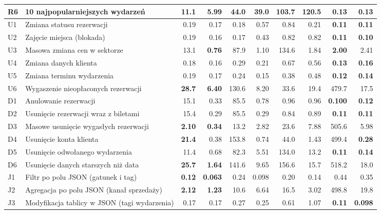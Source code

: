 \begin{tabular}{llrrrrrrrr}
R6 & 10 najpopularniejszych wydarzeń & \num{11.1} & \num{5.99} & \num{44.0} & \num{39.0} & \num{103.7} & \num{120.5} & \textbf{\num{0.13}} & \textbf{\num{0.13}} \\
\midrule
U1 & Zmiana statusu rezerwacji & \num{0.19} & \num{0.17} & \num{0.18} & \num{0.57} & \num{0.84} & \num{0.21} & \textbf{\num{0.11}} & \textbf{\num{0.11}} \\
U2 & Zajęcie miejsca (blokada) & \num{0.19} & \num{0.16} & \num{0.17} & \num{0.43} & \num{0.82} & \num{0.82} & \textbf{\num{0.11}} & \textbf{\num{0.10}} \\
U3 & Masowa zmiana cen w sektorze & \num{13.1} & \textbf{\num{0.76}} & \num{87.9} & \num{1.10} & \num{134.6} & \num{1.84} & \textbf{\num{2.00}} & \num{2.41} \\
U4 & Zmiana danych klienta & \num{0.18} & \num{0.16} & \num{0.29} & \num{0.21} & \num{0.67} & \num{0.56} & \textbf{\num{0.13}} & \textbf{\num{0.16}} \\
U5 & Zmiana terminu wydarzenia & \num{0.19} & \num{0.17} & \num{0.24} & \num{0.15} & \num{0.38} & \num{0.48} & \textbf{\num{0.12}} & \textbf{\num{0.14}} \\
U6 & Wygaszenie nieopłaconych rezerwacji & \textbf{\num{28.7}} & \textbf{\num{6.40}} & \num{130.6} & \num{8.20} & \num{33.6} & \num{19.4} & \num{479.7} & \num{17.5} \\
\midrule
D1 & Anulowanie rezerwacji & \num{15.1} & \num{0.33} & \num{85.5} & \num{0.78} & \num{0.96} & \num{0.96} & \textbf{\num{0.100}} & \textbf{\num{0.12}} \\
D2 & Usunięcie rezerwacji wraz z biletami & \num{15.4} & \num{0.29} & \num{85.5} & \num{0.29} & \num{0.84} & \num{0.89} & \textbf{\num{0.11}} & \textbf{\num{0.11}} \\
D3 & Masowe usunięcie wygasłych rezerwacji & \textbf{\num{2.10}} & \textbf{\num{0.34}} & \num{13.2} & \num{2.82} & \num{23.6} & \num{7.88} & \num{505.6} & \num{5.98} \\
D4 & Usunięcie konta klienta & \textbf{\num{21.4}} & \num{0.38} & \num{153.8} & \num{0.74} & \num{44.0} & \num{1.43} & \num{499.4} & \textbf{\num{0.28}} \\
D5 & Usunięcie odwołanego wydarzenia & \num{11.4} & \num{0.68} & \num{82.3} & \num{5.51} & \num{134.0} & \num{13.2} & \textbf{\num{0.11}} & \textbf{\num{0.14}} \\
D6 & Usunięcie danych starszych niż data & \textbf{\num{25.7}} & \textbf{\num{1.64}} & \num{141.6} & \num{9.65} & \num{156.6} & \num{15.7} & \num{518.2} & \num{18.0} \\
\midrule
J1 & Filtr po polu JSON (gatunek i tag) & \textbf{\num{0.12}} & \textbf{\num{0.063}} & \num{0.24} & \num{0.098} & \num{0.20} & \num{0.14} & \num{0.44} & \num{0.35} \\
J2 & Agregacja po polu JSON (kanał sprzedaży) & \textbf{\num{2.12}} & \textbf{\num{1.23}} & \num{10.6} & \num{6.64} & \num{16.5} & \num{3.02} & \num{498.8} & \num{19.8} \\
J3 & Modyfikacja tablicy w JSON (tagi wydarzenia) & \num{0.17} & \num{0.17} & \num{0.27} & \num{0.25} & \num{0.61} & \num{1.07} & \textbf{\num{0.11}} & \textbf{\num{0.098}} \\
\bottomrule
\end{tabular}
